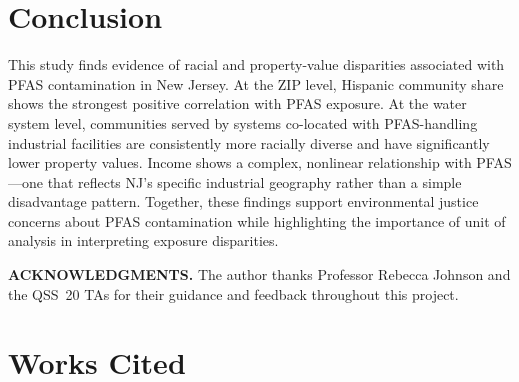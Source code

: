 \documentclass[9pt,twocolumn]{extarticle}
\begin{document}
\section{Conclusion}

This study finds evidence of racial and property-value disparities associated with PFAS contamination in New Jersey. At the ZIP level, Hispanic community share shows the strongest positive correlation with PFAS exposure. At the water system level, communities served by systems co-located with PFAS-handling industrial facilities are consistently more racially diverse and have significantly lower property values. Income shows a complex, nonlinear relationship with PFAS---one that reflects NJ's specific industrial geography rather than a simple disadvantage pattern. Together, these findings support environmental justice concerns about PFAS contamination while highlighting the importance of unit of analysis in interpreting exposure disparities.

\vspace{6pt}
\noindent\textbf{ACKNOWLEDGMENTS.} The author thanks Professor Rebecca Johnson and the QSS~20 TAs for their guidance and feedback throughout this project.

\section{Works Cited}


\end{document}
